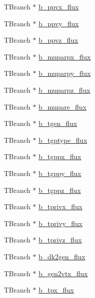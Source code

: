 \begin{DoxyCompactItemize}
T\-Branch $\ast$ \hyperlink{classanatree_a719cff1cebb13d73c1fe8e90ca00e4fb}{b\-\_\-ppvx\-\_\-flux}
\item 
T\-Branch $\ast$ \hyperlink{classanatree_a5e4017ab48e75144d769258aad80398b}{b\-\_\-ppvy\-\_\-flux}
\item 
T\-Branch $\ast$ \hyperlink{classanatree_a19246cdffce6f1b74eb4a96abc854606}{b\-\_\-ppvz\-\_\-flux}
\item 
T\-Branch $\ast$ \hyperlink{classanatree_a9f57900436c5739afe8cfd1aada3251a}{b\-\_\-muparpx\-\_\-flux}
\item 
T\-Branch $\ast$ \hyperlink{classanatree_a5862c6680dbe6fcc0aa1643e38c1f01b}{b\-\_\-muparpy\-\_\-flux}
\item 
T\-Branch $\ast$ \hyperlink{classanatree_a7e4a4ffff35ec4de18a4f1377f1eec62}{b\-\_\-muparpz\-\_\-flux}
\item 
T\-Branch $\ast$ \hyperlink{classanatree_a4a2c741634b458071456b19322282e1d}{b\-\_\-mupare\-\_\-flux}
\item 
T\-Branch $\ast$ \hyperlink{classanatree_a0f289990b052dbcdc40dd6d1ea5798a7}{b\-\_\-tgen\-\_\-flux}
\item 
T\-Branch $\ast$ \hyperlink{classanatree_abe888fba3e001ec0a569575edf1c7cf9}{b\-\_\-tgptype\-\_\-flux}
\item 
T\-Branch $\ast$ \hyperlink{classanatree_a16323472ae6246ffa02bc96feac7b1a1}{b\-\_\-tgppx\-\_\-flux}
\item 
T\-Branch $\ast$ \hyperlink{classanatree_a29ce4d270eab89919ec6726c15decdac}{b\-\_\-tgppy\-\_\-flux}
\item 
T\-Branch $\ast$ \hyperlink{classanatree_a9e71eb8b68982c74946405cc35db78e0}{b\-\_\-tgppz\-\_\-flux}
\item 
T\-Branch $\ast$ \hyperlink{classanatree_a67ed577b9a051892728d26ee32b830d9}{b\-\_\-tprivx\-\_\-flux}
\item 
T\-Branch $\ast$ \hyperlink{classanatree_a4a517313a9a9c2a855d1eb2d5e4b0325}{b\-\_\-tprivy\-\_\-flux}
\item 
T\-Branch $\ast$ \hyperlink{classanatree_a48e6e6429fccc1b953f1a3c8acfb6c55}{b\-\_\-tprivz\-\_\-flux}
\item 
T\-Branch $\ast$ \hyperlink{classanatree_a5469514a924ef658f47633d33036b1b7}{b\-\_\-dk2gen\-\_\-flux}
\item 
T\-Branch $\ast$ \hyperlink{classanatree_a2296fab8dc0c2d1e7d0ee710d2882fd0}{b\-\_\-gen2vtx\-\_\-flux}
\item 
T\-Branch $\ast$ \hyperlink{classanatree_ae69a91152a16a0a67aa668f31646dcb3}{b\-\_\-tpx\-\_\-flux}

\end{DoxyCompactItemize}
